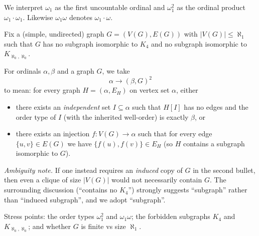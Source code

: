 \par
We interpret $\omega_1$ as the first uncountable ordinal and $\omega_1^2$ as the ordinal product $\omega_1\cdot\omega_1$. Likewise $\omega_1\omega$ denotes $\omega_1\cdot\omega$.

Fix a (simple, undirected) graph $G=(V(G),E(G))$ with $|V(G)|\le\aleph_1$ such that $G$ has no subgraph isomorphic to $K_4$ and no subgraph isomorphic to $K_{\aleph_0,\aleph_0}$.

For ordinals $\alpha,\beta$ and a graph $G$, we take
\[
\alpha\to(\beta,G)^2
\]
to mean: for every graph $H=(\alpha,E_H)$ on vertex set $\alpha$, either
\begin{itemize}
\item there exists an \emph{independent} set $I\subseteq\alpha$ such that $H[I]$ has no edges and the order type of $I$ (with the inherited well-order) is exactly $\beta$, or
\item there exists an injection $f:V(G)\to\alpha$ such that for every edge $\{u,v\}\in E(G)$ we have $\{f(u),f(v)\}\in E_H$ (so $H$ contains a subgraph isomorphic to $G$).
\end{itemize}

\emph{Ambiguity note.} If one instead requires an \emph{induced} copy of $G$ in the second bullet, then even a clique of size $|V(G)|$ would not necessarily contain $G$. The surrounding discussion (``contains no $K_4$'') strongly suggests ``subgraph'' rather than ``induced subgraph'', and we adopt ``subgraph''.

Stress points: the order types $\omega_1^2$ and $\omega_1\omega$; the forbidden subgraphs $K_4$ and $K_{\aleph_0,\aleph_0}$; and whether $G$ is finite vs size $\aleph_1$.
